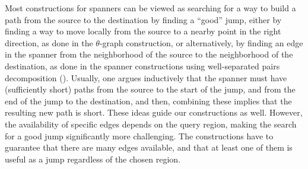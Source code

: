 Most constructions for spanners can be viewed as searching for a way
to build a path from the source to the destination by finding a
``good'' jump, either by finding a way to move locally from the source
to a nearby point in the right direction, as done in the
$\theta$-graph construction, or alternatively, by finding an edge in
the spanner from the neighborhood of the source to the neighborhood of
the destination, as done in the spanner constructions using
well-separated pairs decomposition (\WSPD). Usually, one argues
inductively that the spanner must have (sufficiently short) paths from
the source to the start of the jump, and from the end of the jump to
the destination, and then, combining these implies that the resulting new
path is short.  These ideas guide our constructions as well. However,
the availability of specific edges depends on the query region, making
the search for a good jump significantly more challenging. The
constructions have to guarantee that there are many edges available,
and that at least one of them is useful as a jump regardless of the chosen region.


